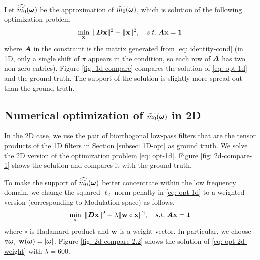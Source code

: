 Let $\widehat{\widetilde{m_{0}}}(\boldsymbol{\omega})$ be the approximation of $\widetilde{m_{0}}(\boldsymbol{\omega})$, which is solution of the following optimization problem
\begin{align}
\min_{\mathbf{x}}\; \Vert \boldsymbol{D}\mathbf{x}\Vert^2 + \Vert \mathbf{x}\Vert^2,\quad s.t. \; \boldsymbol{A}\mathbf{x} = \mathbf{1} \label{eq: opt-1d}
\end{align}
where $\boldsymbol{A}$ in the constraint is the matrix generated from \eqref{eq: identity-cond} (in 1D, only a single shift of $\pi$ appears in the condition, so each row of $\boldsymbol{A}$ has two non-zero entries). 
Figure \ref{fig: 1d-compare} compares the solution of \eqref{eq: opt-1d} and the ground truth. The support of the solution is slightly more spread out than the ground truth.

\subsection{Numerical optimization of $\widetilde{m_{0}}(\boldsymbol{\omega})$ in 2D}
In the 2D case, we use the pair of biorthogonal low-pass filters that are the tensor products of the 1D filters in Section \ref{subsec: 1D-opt} as ground truth. We solve the 2D version of the optimization problem \eqref{eq: opt-1d}. Figure \ref{fig: 2d-compare-1} shows the solution and compares it with the ground truth. 



To make the support of $\widehat{\widetilde{m_{0}}}(\boldsymbol{\omega})$ better concentrate within the low frequency domain, we change the squared $\ell_2$-norm penalty in \eqref{eq: opt-1d} to a weighted version (corresponding to Modulation space) as follows,
\begin{align}
\min_{\mathbf{x}}\; \Vert\boldsymbol{ D}\mathbf{x}\Vert^2 + \lambda\Vert \mathbf{w}\circ\mathbf{x}\Vert^2,\quad s.t. \; \boldsymbol{A}\mathbf{x} = \mathbf{1} \label{eq: opt-2d-weight}
\end{align} 
where $\circ$ is Hadamard product and $\mathbf{w}$ is a weight vector. In particular, we choose $\forall \boldsymbol{\omega}, \; \mathbf{w}(\boldsymbol{\omega}) = |\boldsymbol{\omega}|$. Figure \ref{fig: 2d-compare-2.2} shows the solution of \eqref{eq: opt-2d-weight} with $\lambda=600$. %

